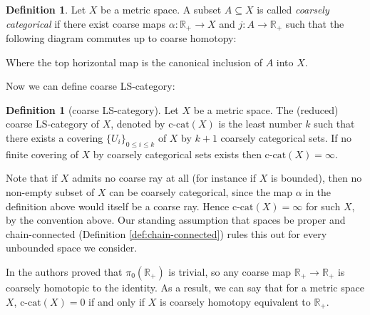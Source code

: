 \documentclass {amsart}
\newcommand {\ccat}     {\text{c-cat}}
\newcommand {\Rplus}    {\mathbb{R}_{+}}
\theoremstyle {definition}
\newtheorem   {definition}  [theorem] {Definition}
\begin{document}
\begin{definition}

    Let \( X \) be a metric space. A subset \( A \subseteq X \) is called
    \emph{coarsely categorical} if there exist coarse maps \( \alpha : \Rplus \to X
    \) and \( j : A \to \Rplus \) such that the following diagram commutes up to
    coarse homotopy:

    \begin{center}


    \end{center}

    Where the top horizontal map is the canonical inclusion of \( A \) into \( X
    \).

\end{definition}

Now we can define coarse LS-category:

\begin{definition}[coarse LS-category]
    Let \( X \) be a metric space. The (reduced) coarse LS-category of \( X \),
    denoted by \( \ccat (X) \) is the least number \( k \) such that there exists
    a covering \( \{U_i\} _{0 \leq i \leq k} \) of \( X \) by \( k+1 \) coarsely
    categorical sets. If no finite covering of \( X \) by coarsely categorical
    sets exists then \( \ccat (X) = \infty \).
\end{definition}

Note that if \( X \) admits no coarse ray at all (for instance if \( X \) is
bounded), then no non-empty subset of \( X \) can be coarsely categorical, since
the map \( \alpha \) in the definition above would itself be a coarse ray.
Hence \( \ccat(X) = \infty \) for such \( X \), by the convention above. Our
standing assumption that spaces be proper and chain-connected
(Definition \ref{def:chain-connected}) rules this out for every unbounded space
we consider.

In \cite{mitchenerCoarseHomotopyGroups2020} the authors proved that \( \pi_0
(\Rplus) \) is trivial, so any coarse map \( \Rplus \to \Rplus \) is coarsely
homotopic to the identity. As a result, we can say that for a metric space \( X
\), \( \ccat(X) = 0 \) if and only if \( X \) is coarsely homotopy equivalent to
\( \Rplus \). 
\end{document}
